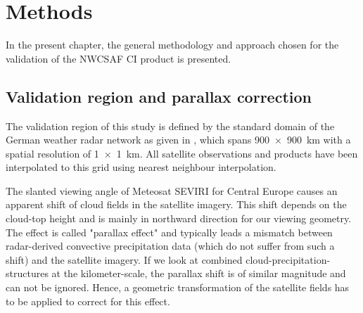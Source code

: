 \chapter{Methods}
In the present chapter, the general methodology and approach chosen for the validation of the NWCSAF CI product is presented.

\section{Validation region and parallax correction}
The validation region of this study is defined by the standard domain of the German weather radar network as given in \citet{RADOLANkurz2018}, which spans \SI{900 x 900}{\kilo\metre} with a spatial resolution of \SI{1 x 1}{\kilo\metre}. All satellite observations and products have been interpolated to this grid using nearest neighbour interpolation.

The slanted viewing angle of Meteosat SEVIRI for Central Europe causes an apparent shift of cloud fields in the satellite imagery. This shift depends on the cloud-top height and is mainly in northward direction for our viewing geometry. The effect is called "parallax effect" and typically leads a mismatch between radar-derived convective precipitation data (which do not suffer from such a shift) and the satellite imagery. If we look at combined cloud-precipitation-structures at the kilometer-scale, the parallax shift is of similar magnitude and  can not be ignored. Hence, a geometric transformation of the satellite fields has to be applied to correct for this effect.

